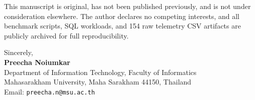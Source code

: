 \documentclass[11pt,a4paper]{article}
\begin{document}
This manuscript is original, has not been published previously, and is not under consideration elsewhere. The author declares no competing interests, and all benchmark scripts, SQL workloads, and 154 raw telemetry CSV artifacts are publicly archived for full reproducibility.

Sincerely,\\[8pt]
\textbf{Preecha Noiumkar}\\
Department of Information Technology, Faculty of Informatics\\
Mahasarakham University, Maha Sarakham 44150, Thailand\\
Email: \texttt{preecha.n@msu.ac.th}
\end{document}
